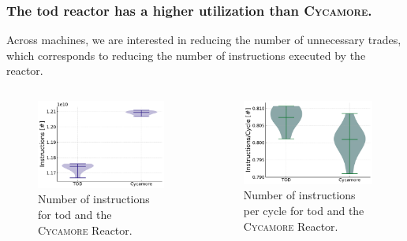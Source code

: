 \documentclass[9pt]{beamer}
\newcommand{\cycamore}{\textsc{Cycamore}\xspace}
\begin{document}
\begin{frame}
  \frametitle{The \gls{tod} reactor has a higher utilization than \cycamore.}
Across machines, we are interested in reducing the number of unnecessary trades, which corresponds to reducing the number of instructions executed by the reactor. \pause
  \begin{columns}
    \column[t]{5cm}
    \begin{figure}
      \centering
      \includegraphics[width=1.01\textwidth]{images/ins_violin.pdf}
      \caption{Number of instructions for \gls{tod} and the \cycamore Reactor.}
      \label{fig:ins_tod_cyc}
    \end{figure}

    \column[t]{5cm}
    \begin{figure}[htbp!]
      \begin{center}
        \includegraphics[width=1.065\textwidth]{images/ins_per_cyc.pdf}
      \end{center}
      \caption{Number of instructions per cycle for \gls{tod} and the \cycamore Reactor.}
      \label{fig:ins_per_cyc}
    \end{figure}
  \end{columns}
\end{frame}
\end{document}
